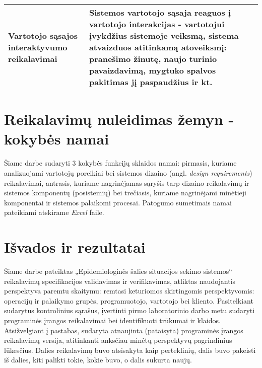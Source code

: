 \documentclass{VUMIFPSkursinis}
\begin{document}
\begin{center}
\begin{longtable}{|C{2cm}|L{5cm}|L{8cm}|}
		\color{blue}Vartotojo sąsajos interaktyvumo reikalavimai          &
		\color{blue}Sistemos vartotojo sąsaja reaguos į vartotojo interakcijas - vartotojui įvykdžius sistemoje veiksmą, sistema atvaizduos atitinkamą atoveiksmį: pranešimo žinutę, naujo turinio pavaizdavimą, mygtuko spalvos pakitimas jį paspaudžius ir kt.                                                                                                                                                                                                                                                                                                                                                                                                                                                                                                                                              \\ \hline
	\end{longtable}
\end{center}

\section{Reikalavimų nuleidimas žemyn - kokybės namai}

Šiame darbe sudaryti 3 kokybės funkcijų sklaidos namai: pirmasis, kuriame analizuojami vartotojų poreikiai bei
sistemos dizaino (angl. \textit{design requirements}) reikalavimai, antrasis, kuriame nagrinėjamas sąryšis tarp 
dizaino reikalavimų ir sistemos komponentų (posistemių) bei trečiasis, kuriame nagrinėjami minėtieji komponentai 
ir sistemos palaikomi procesai. Patogumo sumetimais namai pateikiami atskirame \textit{Excel} faile.

\section{Išvados ir rezultatai}

Šiame darbe pateiktas „Epidemiologinės šalies situacijos sekimo sistemos“ reikalavimų specifikacijos validavimas ir verifikavimas, atliktas naudojantis perspektyva paremtu
skaitymu: remtasi keturiomos skirtingomis perspektyvomis: operacijų ir palaikymo grupės, programuotojo, vartotojo bei kliento. Pasitelkiant sudarytus kontrolinius sąrašus, 
įvertinti pirmo laboratorinio darbo metu sudaryti programinės įrangos reikalavimai bei identifikuoti trūkumai ir klaidos. Atsižvelgiant į pastabas, sudaryta atnaujinta (pataisyta)
programinės įrangos reikalavimų versija, atitinkanti anksčiau minėtų perspektyvų pagrindinius lūkesčius. Dalies reikalavimų buvo atsisakyta kaip perteklinių, dalis buvo pakeisti iš dalies,
kiti palikti tokie, kokie buvo, o dalis sukurta naujų. 
\end{document}
